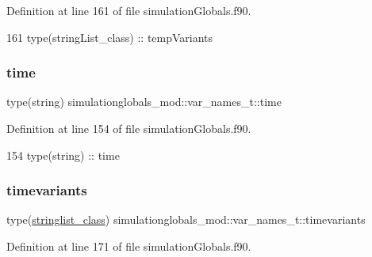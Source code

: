 Definition at line 161 of file simulation\+Globals.\+f90.


\begin{DoxyCode}
161         \textcolor{keywordtype}{type}(stringList\_class) :: tempVariants
\end{DoxyCode}
\mbox{\label{structsimulationglobals__mod_1_1var__names__t_a3826ddc89095f68c7ff6ee007adaaa45}} 
\subsubsection{\texorpdfstring{time}{time}}
{\footnotesize\ttfamily type(string) simulationglobals\+\_\+mod\+::var\+\_\+names\+\_\+t\+::time\hspace{0.3cm}{\ttfamily [private]}}



Definition at line 154 of file simulation\+Globals.\+f90.


\begin{DoxyCode}
154         \textcolor{keywordtype}{type}(string) :: time
\end{DoxyCode}
\mbox{\label{structsimulationglobals__mod_1_1var__names__t_a983950f023530bcc71b0a6d2d0037cbc}} 
\subsubsection{\texorpdfstring{timevariants}{timevariants}}
{\footnotesize\ttfamily type(\mbox{\hyperlink{structsimulationglobals__mod_1_1stringlist__class}{stringlist\+\_\+class}}) simulationglobals\+\_\+mod\+::var\+\_\+names\+\_\+t\+::timevariants\hspace{0.3cm}{\ttfamily [private]}}



Definition at line 171 of file simulation\+Globals.\+f90.


